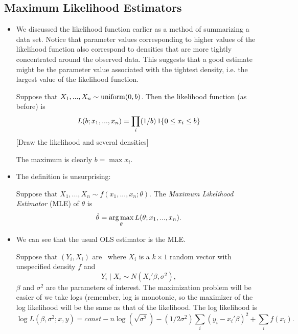 \subsection{Maximum Likelihood Estimators}

\begin{itemize}

\item We discussed the likelihood function earlier as a method of
  summarizing a data set.  Notice that parameter values corresponding
  to higher values of the likelihood function also correspond to
  densities that are more tightly concentrated around the observed
  data.  This suggests that a good estimate might be the parameter
  value associated with the tightest density, i.e. the largest value
  of the likelihood function.

  \begin{ex} Suppose that $X_1,...,X_n \sim \operatorname{uniform}(0, b)$.  Then the
    likelihood function (as before) is
    \begin{equation*}
      L(b; x_1,...,x_n) = \prod_i (1/b) \operatorname{1}\{0 \leq x_i \leq b\}
    \end{equation*}
    [Draw the likelihood and several densities]

    The maximum is clearly $b = \max x_i$.
  \end{ex}

\item The definition is unsurprising:
  \begin{defn}
    Suppose that $X_1,...,X_n \sim f(x_1,...,x_n; \theta)$.  The \emph{Maximum
      Likelihood Estimator} (MLE) of $\theta$ is
    \begin{equation*}
      \hat{\theta} = \operatorname*{arg\,max}_\theta L(\theta; x_1,...,x_n).
    \end{equation*}
  \end{defn}

\item We can see that the usual OLS estimator is the MLE.
  \begin{ex} Suppose that $(Y_i,X_i)$ are \iid\ where $X_i$ is a $k \times
    1$ random vector with unspecified density $f$ and
    \begin{equation*}
      Y_i \mid X_i \sim N(X_i'\beta, \sigma^2),
    \end{equation*}
    $\beta$ and $\sigma^2$ are the parameters of interest.  The maximization
    problem will be easier of we take logs (remember, log is
    monotonic, so the maximizer of the log likelihood will be the same
    as that of the likelihood.  The log likelihood is
    \begin{equation*}
      \log L(\beta,\sigma^2; x, y) = const - n\log (\sqrt{\sigma^2}) -
      (1/2\sigma^2) \sum_i (y_i - x_i'\beta)^2 + \sum_i f(x_i).
    \end{equation*}
    

\end{ex}
\end{itemize}
